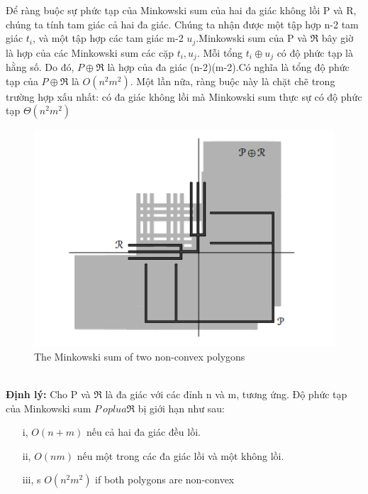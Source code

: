 \documentclass[a4paper,12pt]{report}
\begin{document}
Để ràng buộc sự phức tạp của Minkowski sum của hai đa giác không lồi P và R, chúng ta tính tam giác cả hai đa giác. Chúng ta nhận được một tập hợp n-2 tam giác $t_i$, và một tập hợp các tam giác m-2 $u_j$.Minkowski sum của P và $\Re$ bây giờ là hợp của các Minkowski sum các cặp $t_i, u_j$. Mỗi tổng $t_i \oplus u_j$ có độ phức tạp là hằng số. Do đó, $P \oplus \Re$ là hợp của đa giác (n-2)(m-2).Có nghĩa là tổng độ phức tạp của $P \oplus \Re$ là $O(n^2m^2)$. Một lần nữa, ràng buộc này là chặt chẽ trong trường hợp xấu nhất: có đa giác không lồi mà Minkowski sum thực sự có độ phức tạp $\Theta(n^2m^2)$ \\
\begin{figure}[h]
\begin{center}
\includegraphics[width=0.6\linewidth]{11.png}
\caption{The Minkowski sum of two non-convex polygons}
\end{center}
\end{figure}\\
\textbf{Định lý:} Cho P và $\Re$ là đa giác với các đỉnh n và m, tương ứng. Độ phức tạp của Minkowski sum $P\ oplua \Re$ bị giới hạn như sau:
\begin{itemize}
\item[i, ] $O(n+m)$ nếu cả hai đa giác đều lồi.
\item[ii, ] $O(nm)$ nếu một trong các đa giác lồi và một không lồi.
\item[iii, ] s $O(n^2m^2)$ if both polygons are non-convex
\end{itemize}
\end{document}
